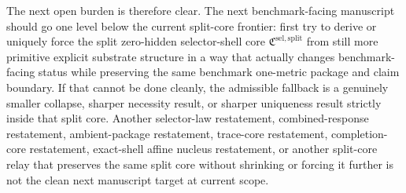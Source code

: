 \documentclass[11pt]{article}
\newcommand{\SelectorCore}{\mathfrak C^{\mathrm{sel,split}}}
\begin{document}
The next open burden is therefore clear. The next benchmark-facing manuscript should go one level below the current split-core frontier: first try to derive or uniquely force the split zero-hidden selector-shell core \(\SelectorCore\) from still more primitive explicit substrate structure in a way that actually changes benchmark-facing status while preserving the same benchmark one-metric package and claim boundary. If that cannot be done cleanly, the admissible fallback is a genuinely smaller collapse, sharper necessity result, or sharper uniqueness result strictly inside that split core. Another selector-law restatement, combined-response restatement, ambient-package restatement, trace-core restatement, completion-core restatement, exact-shell affine nucleus restatement, or another split-core relay that preserves the same split core without shrinking or forcing it further is not the clean next manuscript target at current scope.
\end{document}
